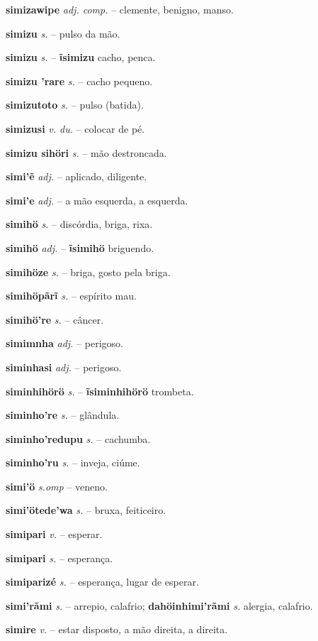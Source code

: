 \textbf{simizawipe} \textit{adj. comp.} -- clemente, benigno, manso.

\textbf{simizu} \textit{s.} -- pulso da mão.

\textbf{simizu} \textit{s.} -- \textbf{ĩsimizu} cacho, penca.

\textbf{simizu 'rare} \textit{s.} -- cacho pequeno.

\textbf{simizutoto} \textit{s.} -- pulso (batida).

\textbf{simizusi} \textit{v. du.} -- colocar de pé.

\textbf{simizu sihöri} \textit{s.} -- mão destroncada.

\textbf{simi'ẽ} \textit{adj.} -- aplicado, diligente.

\textbf{simi'e} \textit{adj.} -- a mão esquerda, a esquerda.

\textbf{simihö} \textit{s.} -- discórdia, briga, rixa.

\textbf{simihö} \textit{adj.} -- \textbf{ĩsimihö} briguendo.

\textbf{simihöze} \textit{s.} -- briga, gosto pela briga.

\textbf{simihöpãrĩ} \textit{s.} -- espírito mau.

\textbf{simihö're} \textit{s.} -- câncer.

\textbf{simimnha} \textit{adj.} -- perigoso.

\textbf{siminhasi} \textit{adj.} -- perigoso.

\textbf{siminhihörö} \textit{s.} -- \textbf{ĩsiminhihörö} trombeta.

\textbf{siminho're} \textit{s.} -- glândula.

\textbf{siminho'redupu} \textit{s.} -- cachumba.

\textbf{siminho'ru} \textit{s.} -- inveja, ciúme.

\textbf{simi'ö} \textit{s.omp} -- veneno.

\textbf{simi'ötede'wa} \textit{s.} -- bruxa, feiticeiro.

\textbf{simipari} \textit{v.} -- esperar.

\textbf{simipari} \textit{s.} -- esperança.

\textbf{simiparizé} \textit{s.} -- esperança, lugar de esperar.

\textbf{simi'rãmi} \textit{s.} -- arrepio, calafrio; \textbf{dahöinhimi'rãmi} \textit{s.} alergia, calafrio.

\textbf{simire} \textit{v.} -- estar disposto, a mão direita, a direita.


